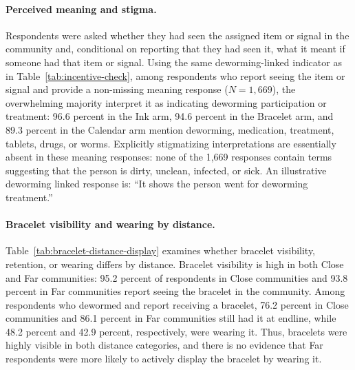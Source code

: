 \documentclass[ECM\space ReStud.tex]{subfiles}
\begin{document}
\paragraph{Perceived meaning and stigma.}
Respondents were asked whether they had seen the assigned item or signal in the community and, conditional on reporting that they had seen it, what it meant if someone had that item or signal. Using the same deworming-linked indicator as in Table~\ref{tab:incentive-check}, among respondents who report seeing the item or signal and provide a non-missing meaning response (\(N=1{,}669\)), the overwhelming majority interpret it as indicating deworming participation or treatment: 96.6 percent in the Ink arm, 94.6 percent in the Bracelet arm, and 89.3 percent in the Calendar arm mention deworming, medication, treatment, tablets, drugs, or worms. Explicitly stigmatizing interpretations are essentially absent in these meaning responses: none of the 1{,}669 responses contain terms suggesting that the person is dirty, unclean, infected, or sick. An illustrative deworming linked response is: ``It shows the person went for deworming treatment.''

\paragraph{Bracelet visibility and wearing by distance.}
Table~\ref{tab:bracelet-distance-display} examines whether bracelet visibility, retention, or wearing differs by distance. Bracelet visibility is high in both Close and Far communities: 95.2 percent of respondents in Close communities and 93.8 percent in Far communities report seeing the bracelet in the community. Among respondents who dewormed and report receiving a bracelet, 76.2 percent in Close communities and 86.1 percent in Far communities still had it at endline, while 48.2 percent and 42.9 percent, respectively, were wearing it. Thus, bracelets were highly visible in both distance categories, and there is no evidence that Far respondents were more likely to actively display the bracelet by wearing it.


\begin{table}[ht!]
    \scriptsize
    \caption{Bracelet Visibility, Retention, and Wearing by Distance}
    \label{tab:bracelet-distance-display}
    \centering
    \begin{threeparttable}
    
    \end{threeparttable}
\end{table}
\end{document}
